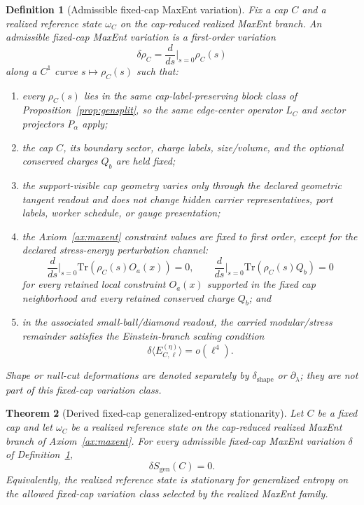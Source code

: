 \documentclass[11pt]{article}
\newtheorem{theorem}{Theorem}[section]
\newtheorem{definition}[theorem]{Definition}
\begin{document}
\begin{definition}[Admissible fixed-cap MaxEnt variation]\label{def:equilibriumvariation}
Fix a cap \(C\) and a realized reference state \(\omega_C\) on the cap-reduced realized MaxEnt branch. An admissible fixed-cap MaxEnt variation is a first-order variation
\[
\delta\rho_C=\frac{d}{ds}\Big|_{s=0}\rho_C(s)
\]
along a \(C^1\) curve \(s\mapsto \rho_C(s)\) such that:
\begin{enumerate}[leftmargin=2em]
\item every \(\rho_C(s)\) lies in the same cap-label-preserving block class of Proposition~\ref{prop:gensplit}, so the same edge-center operator \(L_C\) and sector projectors \(P_\alpha\) apply;
\item the cap \(C\), its boundary sector, charge labels, size/volume, and the optional conserved charges \(Q_b\) are held fixed;
\item the support-visible cap geometry varies only through the declared geometric tangent readout and does not change hidden carrier representatives, port labels, worker schedule, or gauge presentation;
\item the Axiom~\ref{ax:maxent} constraint values are fixed to first order, except for the declared stress-energy perturbation channel:
\[
\frac{d}{ds}\Big|_{s=0}\mathrm{Tr}(\rho_C(s) O_a(x))=0,
\qquad
\frac{d}{ds}\Big|_{s=0}\mathrm{Tr}(\rho_C(s) Q_b)=0
\]
for every retained local constraint \(O_a(x)\) supported in the fixed cap neighborhood and every retained conserved charge \(Q_b\); and
\item in the associated small-ball/diamond readout, the carried modular/stress remainder satisfies the Einstein-branch scaling condition
\[
\delta\langle E^{(\eta)}_{C,\ell}\rangle=o(\ell^4).
\]
\end{enumerate}
Shape or null-cut deformations are denoted separately by \(\delta_{\mathrm{shape}}\) or \(\partial_\lambda\); they are not part of this fixed-cap variation class.
\end{definition}

\begin{theorem}[Derived fixed-cap generalized-entropy stationarity]\label{thm:equilibrium}
Let \(C\) be a fixed cap and let \(\omega_C\) be a realized reference state on the cap-reduced realized MaxEnt branch of Axiom~\ref{ax:maxent}. For every admissible fixed-cap MaxEnt variation \(\delta\) of Definition~\ref{def:equilibriumvariation},
\[
\delta S_{\mathrm{gen}}(C)=0.
\]
Equivalently, the realized reference state is stationary for generalized entropy on the allowed fixed-cap variation class selected by the realized MaxEnt family.
\end{theorem}
\end{document}
